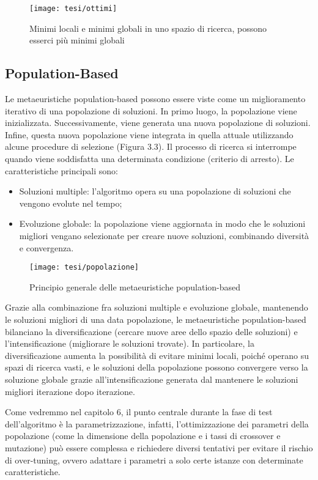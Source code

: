 \begin{figure}[!ht] 
    \centering 
    \texttt{[image: tesi/ottimi]} 
    \caption{Minimi locali e minimi globali in uno spazio di ricerca, possono esserci più minimi globali}
\end{figure}

\subsection{Population-Based}

Le metaeuristiche population-based possono essere viste come un miglioramento iterativo di una popolazione di soluzioni. In primo luogo, la popolazione viene inizializzata. Successivamente, viene generata una nuova popolazione di soluzioni. Infine, questa nuova popolazione viene integrata in quella attuale utilizzando alcune procedure di selezione (Figura 3.3). Il processo di ricerca si interrompe quando viene soddisfatta una determinata condizione (criterio di arresto). %
Le caratteristiche principali sono:
\begin{itemize}
    \item Soluzioni multiple: l'algoritmo opera su una popolazione di soluzioni che vengono evolute nel tempo;
    \item Evoluzione globale: la popolazione viene aggiornata in modo che le soluzioni migliori vengano selezionate per creare nuove soluzioni, combinando diversità e convergenza.
\end{itemize}

\begin{figure}[!ht] 
    \centering 
    \texttt{[image: tesi/popolazione]} 
    \caption{Principio generale delle metaeuristiche population-based}
\end{figure}

Grazie alla combinazione fra soluzioni multiple e evoluzione globale, mantenendo le soluzioni migliori di una data popolazione, le metaeuristiche population-based bilanciano la diversificazione (cercare nuove aree dello spazio delle soluzioni) e l'intensificazione (migliorare le soluzioni trovate). In particolare, la diversificazione aumenta la possibilità di evitare minimi locali, poiché operano su spazi di ricerca vasti, e le soluzioni della popolazione possono convergere verso la soluzione globale grazie all'intensificazione generata dal mantenere le soluzioni migliori iterazione dopo iterazione.

Come vedremmo nel capitolo 6, il punto centrale durante la fase di test dell'algoritmo è la parametrizzazione, infatti, l'ottimizzazione dei parametri della popolazione (come la dimensione della popolazione e i tassi di crossover e mutazione) può essere complessa e richiedere diversi tentativi per evitare il rischio di over-tuning, ovvero adattare i parametri a solo certe istanze con determinate caratteristiche.

